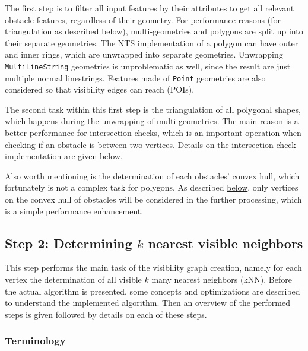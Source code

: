 		The first step is to filter all input features by their attributes to get all relevant obstacle features, regardless of their geometry.
		For performance reasons (for triangulation as described below), multi-geometries and polygons are split up into their separate geometries.
		The NTS implementation of a polygon can have outer and inner rings, which are unwrapped into separate geometries.
		Unwrapping \texttt{MultiLineString} geometries is unproblematic as well, since the result are just multiple normal linestrings.
		Features made of \texttt{Point} geometries are also considered so that visibility edges can reach  (POIs).
		
		The second task within this first step is the triangulation of all polygonal shapes, which happens during the unwrapping of multi geometries.
		The main reason is a better performance for intersection checks, which is an important operation when checking if an obstacle is between two vertices.
		Details on the intersection check implementation are given \hyperref[subsubsec:intersection-checks]{below}.
		
		Also worth mentioning is the determination of each obstacles' convex hull, which fortunately is not a complex task for polygons.
		As described \hyperref[subsubsec:convex-hull]{below}, only vertices on the convex hull of obstacles will be considered in the further processing, which is a simple performance enhancement.
			
	\subsection{Step 2: Determining $k$ nearest visible neighbors}
	\label{subsec:step-2-knn-search}
			
		This step performs the main task of the visibility graph creation, namely for each vertex the determination of all visible $k$ many nearest neighbors (kNN).
		Before the actual algorithm is presented, some concepts and optimizations are described to understand the implemented algorithm.
		Then an overview of the performed steps is given followed by details on each of these steps.
		
		\subsubsection{Terminology}
		
